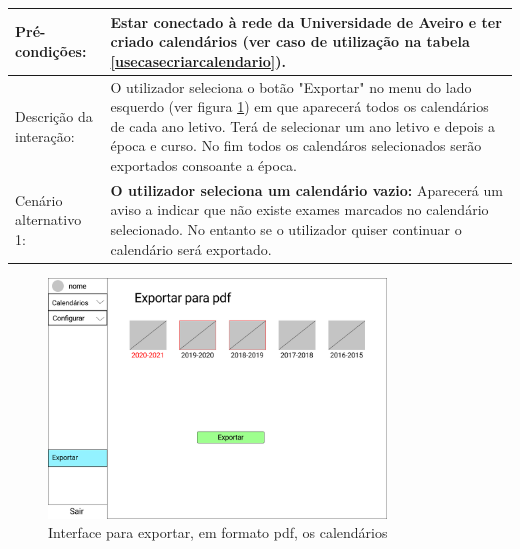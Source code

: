 \documentclass[11pt, twoside]{report}
\begin{document}
\begin{table}[H]
\begin{center}
\begin{tabularx}{\textwidth}{|l|X|}
				\hline
				Pré-condições:           & Estar conectado à rede da Universidade de Aveiro e ter criado calendários (ver caso de utilização na tabela \ref{usecasecriarcalendario}).                                                                                                                                                                      \\
				\hline
				Descrição da interação: & O utilizador seleciona o botão "Exportar" no menu do lado esquerdo (ver figura \ref{interfaceexportarpdf}) em que aparecerá todos os calendários de cada ano letivo. Terá de selecionar um ano letivo e depois a época e curso. No fim todos os calendáros selecionados serão exportados consoante a época. \\
				\hline
				Cenário alternativo 1:     & \textbf{O utilizador seleciona um calendário vazio:} Aparecerá um aviso a indicar que não existe exames marcados no calendário selecionado. No entanto se o utilizador quiser continuar o calendário será exportado.                                                                                          \\
				\hline
				
			\end{tabularx}
		\end{center}
	\end{table}
	
	\begin{figure}[H] 
		\centering 
		\includegraphics[width=0.8\textwidth,height=0.8\textheight,keepaspectratio]{image/prototipowireframes/exportarpdf}
		\caption{Interface para exportar, em formato pdf, os calendários}
		\label{interfaceexportarpdf}
	\end{figure}
	
\end{document}

